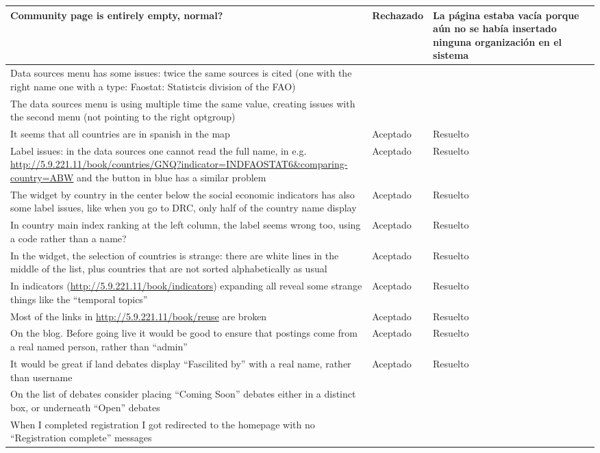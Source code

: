 \begin{longtable}[c]{|p{60mm}|p{20mm}|p{50mm}|}
	Community page is entirely empty, normal? & Rechazado & La página estaba vacía porque aún no se había insertado ninguna organización en el sistema\\
	\hline
	Data sources menu has some issues: twice the same sources is cited (one with the right name one with a type: Faostat: Statistcis division of the FAO) & & \\
	\hline
	The data sources menu is using multiple time the same value, creating issues with the second menu (not pointing to the right optgroup) & & \\
	\hline
	It seems that all countries are in spanish in the map & Aceptado & Resuelto \\
	\hline
	Label issues: in the data sources one cannot read the full name, in e.g. \url{http://5.9.221.11/book/countries/GNQ?indicator=INDFAOSTAT6&comparing-country=ABW} and the button in blue has a similar problem & Aceptado & Resuelto\\
	\hline
	The widget by country in the center below the social economic indicators has also some label issues, like when you go to DRC, only half of the country name display & Aceptado & Resuelto \\
	\hline
	In country main index ranking at the left column, the label seems wrong too, using a code rather than a name? & Aceptado & Resuelto\\
	\hline
	In the widget, the selection of countries is strange: there are white lines in the middle of the list, plus countries that are not sorted alphabetically as usual & Aceptado & Resuelto \\
	\hline
	In indicators (\url{http://5.9.221.11/book/indicators}) expanding all reveal some strange things like the ``temporal topics'' & Aceptado & Resuelto \\
	\hline
	Most of the links in \url{http://5.9.221.11/book/reuse} are broken & Aceptado & Resuelto \\
	\hline
	On the blog.  Before going live it would be good to ensure that postings come from a real named person, rather than ``admin'' & Aceptado & Resuelto \\
	\hline
	It would be great if land debates display ``Fascilited by'' with a real name, rather than username & Aceptado & Resuelto \\
	\hline
	On the list of debates consider placing ``Coming Soon'' debates either in a distinct box, or underneath ``Open'' debates & & \\
	\hline
	When I completed registration I got redirected to the homepage with no ``Registration complete'' messages & & \\

\end{longtable}
